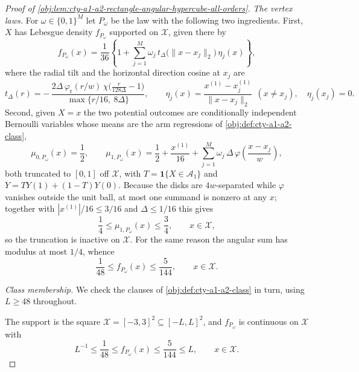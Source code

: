 \documentclass[11pt]{article}
\begin{document}
\begin{proof}[Proof of \cref{obj:lem:cty-a1-a2-rectangle-angular-hypercube-all-orders}]
\emph{The vertex laws.}
For \(\omega\in\{0,1\}^M\) let \(P_\omega\) be the law with the following two ingredients.  First, \(X\) has Lebesgue density \(f_{P_\omega}\) supported on \(\mathcal X\), given there by
\[
f_{P_\omega}(x)
=
\frac1{36}
\left\{
1+\sum_{j=1}^{M}\omega_j\,
t_\Delta\bigl(\lVert x-x_j\rVert_2\bigr)\,\eta_j(x)
\right\},
\]
where the radial tilt and the horizontal direction cosine at \(x_j\) are
\[
t_\Delta(r)
=
-\,\frac{2\Delta\,\varphi_{\mathrm r}(r/w)\,
\chi\bigl(\tfrac{r}{128\Delta}-1\bigr)}
{\max\{r/16,\ 8\Delta\}},
\qquad
\eta_j(x)=\frac{x^{(1)}-x_j^{(1)}}{\lVert x-x_j\rVert_2}
\ \ (x\neq x_j),
\quad
\eta_j(x_j)=0 .
\]
Second, given \(X=x\) the two potential outcomes are conditionally independent Bernoulli variables whose means are the arm regressions of \cref{obj:def:cty-a1-a2-class},
\[
\mu_{0,P_\omega}(x)=\frac12,
\qquad
\mu_{1,P_\omega}(x)
=
\frac12+\frac{x^{(1)}}{16}
+\sum_{j=1}^{M}\omega_j\,\Delta\,
\varphi\!\left(\frac{x-x_j}{w}\right),
\]
both truncated to \([0,1]\) off \(\mathcal X\), with \(T=\mathbf 1\{X\in\mathcal A_1\}\) and \(Y=TY(1)+(1-T)Y(0)\).
Because the disks are \(4w\)-separated while \(\varphi\) vanishes outside the unit ball, at most one summand is nonzero at any \(x\); together with \(|x^{(1)}|/16\leq3/16\) and \(\Delta\leq1/16\) this gives
\[
\frac14\leq\mu_{1,P_\omega}(x)\leq\frac34,
\qquad x\in\mathcal X,
\]
so the truncation is inactive on \(\mathcal X\).
For the same reason the angular sum has modulus at most \(1/4\), whence
\[
\frac1{48}\leq f_{P_\omega}(x)\leq\frac5{144},
\qquad x\in\mathcal X.
\]

\emph{Class membership.}
We check the clauses of \cref{obj:def:cty-a1-a2-class} in turn, using \(L\geq48\) throughout.

The support is the square \(\mathcal X=[-3,3]^2\subseteq[-L,L]^2\), and \(f_{P_\omega}\) is continuous on \(\mathcal X\) with
\[
L^{-1}\leq\frac1{48}\leq f_{P_\omega}(x)\leq\frac5{144}\leq L,
\qquad x\in\mathcal X .
\]


\end{proof}
\end{document}
